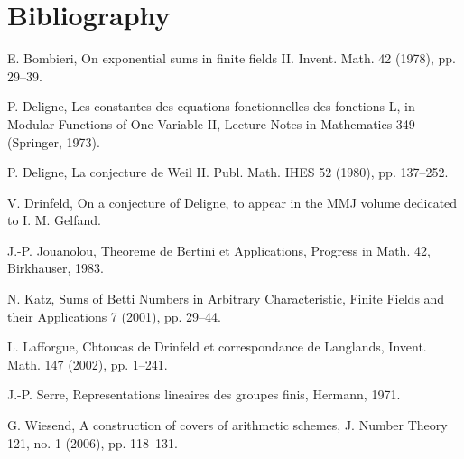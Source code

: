 \documentclass[11pt]{article}
\begin{document}
\section*{Bibliography}
\begin{description}[leftmargin=2.5em]
\item[{[B]}] E. Bombieri, On exponential sums in finite fields II. Invent. Math. 42 (1978), pp. 29--39.
\item[{[De1]}] P. Deligne, Les constantes des equations fonctionnelles des fonctions L, in Modular Functions of One Variable II, Lecture Notes in Mathematics 349 (Springer, 1973).
\item[{[De2]}] P. Deligne, La conjecture de Weil II. Publ. Math. IHES 52 (1980), pp. 137--252.
\item[{[Dr]}] V. Drinfeld, On a conjecture of Deligne, to appear in the MMJ volume dedicated to I. M. Gelfand.
\item[{[J]}] J.-P. Jouanolou, Theoreme de Bertini et Applications, Progress in Math. 42, Birkhauser, 1983.
\item[{[K]}] N. Katz, Sums of Betti Numbers in Arbitrary Characteristic, Finite Fields and their Applications 7 (2001), pp. 29--44.
\item[{[L]}] L. Lafforgue, Chtoucas de Drinfeld et correspondance de Langlands, Invent. Math. 147 (2002), pp. 1--241.
\item[{[S]}] J.-P. Serre, Representations lineaires des groupes finis, Hermann, 1971.
\item[{[W]}] G. Wiesend, A construction of covers of arithmetic schemes, J. Number Theory 121, no. 1 (2006), pp. 118--131.
\end{description}
\end{document}
